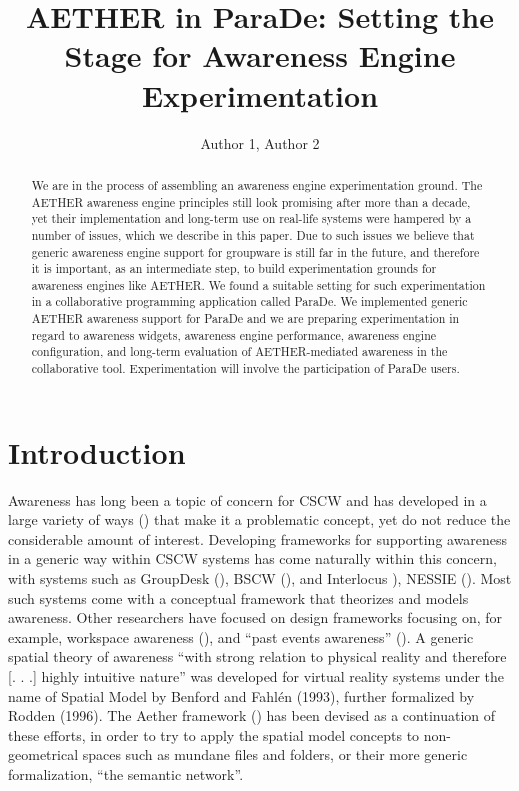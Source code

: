 \documentclass{ecscw2007}
\title{AETHER in ParaDe: Setting the Stage for Awareness Engine Experimentation}
\author{Author 1, Author 2}
\affiliation{Institute 1, Country, Institute 2, Country}
\begin{document}
\maketitle
\thispagestyle{empty}


\begin{abstract}
We are in the process of assembling an awareness engine experimentation ground. The AETHER awareness engine principles still look promising after more than a decade, yet their implementation and long-term use on real-life systems were hampered by a number of issues, which we describe in this paper. Due to such issues we believe that generic awareness engine support for groupware is still far in the future, and therefore it is important, as an intermediate step, to build experimentation grounds for awareness engines like AETHER. We found a suitable setting for such experimentation in a collaborative programming application called ParaDe. We implemented generic AETHER awareness support for ParaDe and we are preparing experimentation in regard to awareness widgets, awareness engine performance, awareness engine configuration, and long-term evaluation of AETHER-mediated awareness in the collaborative tool. Experimentation will involve the participation of ParaDe users.
\end{abstract}

\section*{Introduction}
Awareness has long been a topic of concern for CSCW and has developed in a large variety of ways (\cite{schmidt02}) that make it a problematic concept, yet do not reduce the considerable amount of interest. Developing frameworks for supporting awareness in a generic way within CSCW systems has come naturally within this concern, with systems such as GroupDesk (\cite{fuchs95}), BSCW (\cite{bentley97}), and Interlocus \cite{nomura98}), NESSIE (\cite{prinz99}). Most such systems come with a conceptual framework that theorizes and models awareness. Other researchers have focused on design frameworks focusing on, for example, workspace awareness (\cite{gutwin02}), and ``past events awareness'' (\cite{kirsch-pinheiro03}). A generic spatial theory of awareness ``with strong relation to physical reality and therefore [. . .] highly intuitive nature'' was developed for virtual reality systems under the name of Spatial Model by Benford and Fahl\'{e}n (1993), further formalized by Rodden (1996). The Aether framework (\cite{sandor97}) has been devised as a continuation of these efforts, in order to try to apply the spatial model concepts to non-geometrical spaces such as mundane files and folders, or their more generic formalization, ``the semantic network''.  
\end{document}
